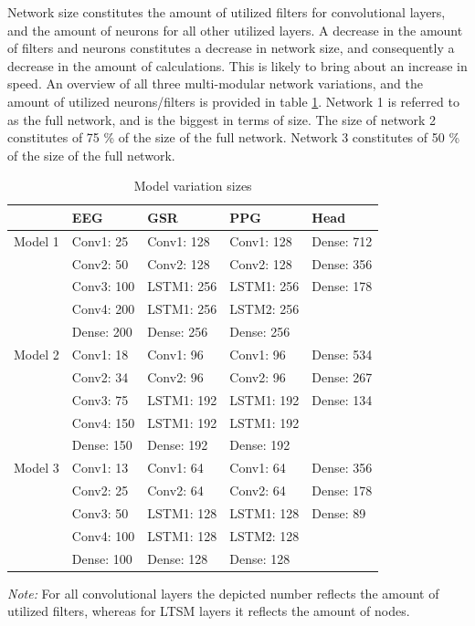 \documentclass[12pt]{article}
\begin{document}
Network size constitutes the amount of utilized filters for convolutional layers, and the amount of neurons for all other utilized layers. A decrease in the amount of filters and neurons constitutes a decrease in network size, and consequently a decrease in the amount of calculations. This is likely to bring about an increase in speed. An overview of all three multi-modular network variations, and the amount of utilized neurons/filters is provided in table \ref{table:modelvariations}. Network 1 is referred to as the full network, and is the biggest in terms of size. The size of network 2 constitutes of 75 \% of the size of the full network. Network 3 constitutes of 50 \% of the size of the full network.

\bgroup
\def\arraystretch{1.6}%
\begin{table}[h]
\centering
\caption{Model variation sizes}
\label{table:modelvariations}
\begin{tabular}{lllll}
\hline
        & EEG        & GSR        & PPG        & Head       \\ \hline
Model 1 & Conv1: 25  & Conv1: 128 & Conv1: 128 & Dense: 712 \\
        & Conv2: 50  & Conv2: 128 & Conv2: 128 & Dense: 356 \\
        & Conv3: 100 & LSTM1: 256 & LSTM1: 256 & Dense: 178 \\
        & Conv4: 200 & LSTM1: 256 & LSTM2: 256 &            \\ 
        \vspace{3ex}
        & Dense: 200 & Dense: 256 & Dense: 256 &            \\ \hline
Model 2 & Conv1: 18  & Conv1: 96  & Conv1: 96  & Dense: 534 \\
        & Conv2: 34  & Conv2: 96  & Conv2: 96  & Dense: 267 \\
        & Conv3: 75  & LSTM1: 192 & LSTM1: 192 & Dense: 134 \\
        & Conv4: 150 & LSTM1: 192 & LSTM1: 192 &            \\
        \vspace{3ex}
        & Dense: 150 & Dense: 192 & Dense: 192 &            \\ \hline
Model 3 & Conv1: 13  & Conv1: 64  & Conv1: 64  & Dense: 356 \\
        & Conv2: 25  & Conv2: 64  & Conv2: 64  & Dense: 178 \\
        & Conv3: 50  & LSTM1: 128 & LSTM1: 128 & Dense: 89  \\
        & Conv4: 100 & LSTM1: 128 & LSTM2: 128 &            \\
        & Dense: 100 & Dense: 128 & Dense: 128 &            \\ \hline
\end{tabular}
\vspace{2ex}

\begin{doublespacing}
{\raggedright \textit{Note:} For all convolutional layers the depicted number reflects the amount of utilized filters, whereas for LTSM layers it reflects the amount  of nodes. \par}
\end{doublespacing}
\end{table}
\egroup
\end{document}
